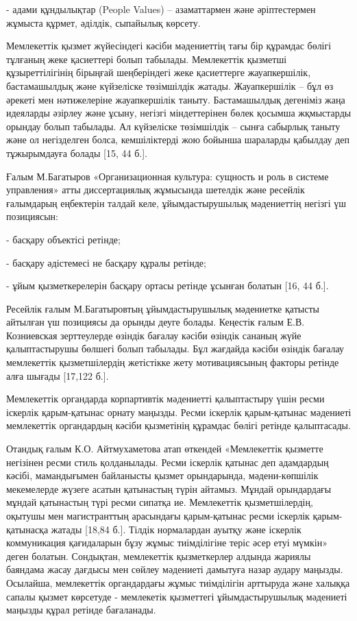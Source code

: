 - адами құндылықтар (People Values) -- азаматтармен және әріптестермен
жұмыста құрмет, әділдік, сыпайылық көрсету.

Мемлекеттік қызмет жүйесіндегі кәсіби мәдениеттің тағы бір құрамдас
бөлігі тұлғаның жеке қасиеттері болып табылады. Мемлекеттік қызметші
құзыреттілігінің бірыңғай шеңберіндегі жеке қасиеттерге жауапкершілік,
бастамашылдық және күйзеліске төзімшілдік жатады. Жауапкершілік -- бұл
өз әрекеті мен нәтижелеріне жауапкершілік таныту. Бастамашылдық
дегеніміз жаңа идеяларды әзірлеу және ұсыну, негізгі міндеттерінен бөлек
қосымша жқмыстарды орындау болып табылады. Ал күйзеліске төзімшілдік --
сынға сабырлық таныту және ол негізделген болса, кемшіліктерді жою
бойынша шараларды қабылдау деп тұжырымдауға болады {[}15, 44 б.{]}.

Ғалым М.Багатыров «Организационная культура: сущность и роль в системе
управления» атты диссертациялық жұмысында шетелдік және ресейлік
ғалымдарың еңбектерін талдай келе, ұйымдастырушылық мәдениеттің негізгі
үш позициясын:

- басқару объектісі ретінде;

- басқару әдістемесі не басқару құралы ретінде;

- ұйым қызметкерелерін басқару ортасы ретінде ұсынған болатын {[}16, 44
б.{]}.

Ресейлік ғалым М.Багатыровтың ұйымдастырушылық мәдениетке қатысты
айтылған үш позициясы да орынды деуге болады. Кеңестік ғалым Е.В.
Козниевская зерттеулерде өзіндік бағалау кәсіби өзіндік сананың жүйе
қалыптастырушы бөлшегі болып табылады. Бұл жағдайда кәсіби өзіндік
бағалау мемлекеттік қызметшілердің жетістікке жету мотивациясының
факторы ретінде алға шығады {[}17,122 б.{]}.

Мемлекеттік органдарда корпартивтік мәдениетті қалыптастыру үшін ресми
іскерлік қарым-қатынас орнату маңызды. Ресми іскерлік қарым-қатынас
мәдениеті мемлекеттік органдардың кәсіби қызметінің құрамдас бөлігі
ретінде қалыптасады.

Отандық ғалым К.О. Айтмухаметова атап өткендей «Мемлекеттік қызметте
негізінен ресми стиль қолданылады. Ресми іскерлік қатынас деп адамдардың
кәсібі, мамандығымен байланысты қызмет орындарында, мәдени-көпшілік
мекемелерде жүзеге асатын қатынастың түрін айтамыз. Мұндай орындардағы
мұндай қатынастың түрі ресми сипатқа ие. Мемлекеттік қызметшілердің,
оқытушы мен магистранттың арасындағы қарым-қатынас ресми іскерлік
қарым-қатынасқа жатады {[}18,84 б.{]}. Тілдік нормалардан ауытқу және
іскерлік коммуникация қағидаларын бұзу жұмыс тиімділігіне теріс әсер
етуі мүмкін» деген болатын. Сондықтан, мемлекеттік қызметкерлер алдында
жариялы баяндама жасау дағдысы мен сөйлеу мәдениеті дамытуға назар
аудару маңызды. Осылайша, мемлекеттік органдардағы жұмыс тиімділігін
арттыруда және халыққа сапалы қызмет көрсетуде - мемлекетік қызметтегі
ұйымдастырушылық мәдениеті маңызды құрал ретінде бағаланады.

